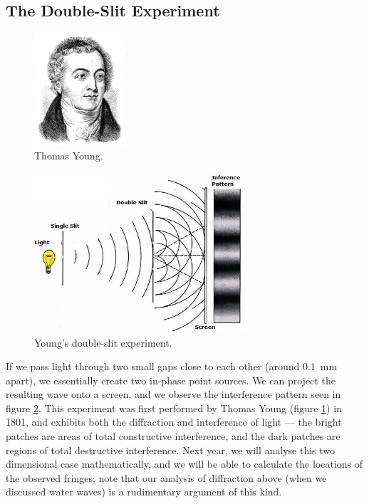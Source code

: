 \documentclass[a4paper]{amsbook}
\begin{document}
\subsection{The Double-Slit Experiment}
\begin{figure}
  \centering
  \includegraphics[width=0.3\textwidth]{young}
  \caption{Thomas Young.\label{fig:young}}
\end{figure}
\begin{figure}
  \centering
  \includegraphics[width=0.7\textwidth]{doubleslit}
  \caption{Young's double-slit experiment.\label{fig:doubleslit}}
\end{figure}
If we pass light through two small gaps close to each other (around \SI{0.1}{\milli\metre} apart), we essentially create two
in-phase point sources. We can project the resulting wave onto a screen, and we observe the interference pattern seen in
figure \ref{fig:doubleslit}. This experiment was first performed by Thomas Young (figure \ref{fig:young}) in 1801, and exhibits
both the diffraction and interference of light --- the bright patches are areas of total constructive interference, and the
dark patches are regions of total destructive interference. Next year, we will analyse this two dimensional case mathematically,
and we will be able to calculate the locations of the observed fringes; note that our analysis of diffraction above (when we
discussed water waves) is a rudimentary argument of this kind.
\end{document}

